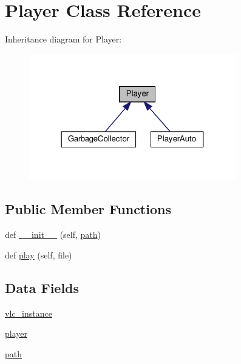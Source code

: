 \hypertarget{class_client_1_1_player}{}\section{Player Class Reference}
\label{class_client_1_1_player}


Inheritance diagram for Player\+:
\nopagebreak
\begin{figure}[H]
\begin{center}
\leavevmode
\includegraphics[width=256pt]{class_client_1_1_player__inherit__graph}
\end{center}
\end{figure}
\subsection*{Public Member Functions}
\begin{DoxyCompactItemize}
\item 
def \hyperlink{class_client_1_1_player_a641e652e956870aa1ad588d8c1e07fc4}{\+\_\+\+\_\+init\+\_\+\+\_\+} (self, \hyperlink{class_client_1_1_player_aa28dc103258589d9cb421197fe2de90b}{path})
\item 
def \hyperlink{class_client_1_1_player_a731e7fe9b0406bdfaba7283d9fdfa810}{play} (self, file)
\end{DoxyCompactItemize}
\subsection*{Data Fields}
\begin{DoxyCompactItemize}
\item 
\hyperlink{class_client_1_1_player_aab28919a2b8782864632be3cbbf0dea9}{vlc\+\_\+instance}
\item 
\hyperlink{class_client_1_1_player_a46afbb77ee4b53026dff7b4f65384dc4}{player}
\item 
\hyperlink{class_client_1_1_player_aa28dc103258589d9cb421197fe2de90b}{path}
\end{DoxyCompactItemize}


